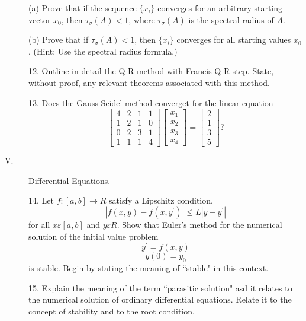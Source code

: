\documentclass{article}
\begin{document}
\begin{description}
\item[\qquad] (a)
Prove that if the sequence $\{x_i\}$ converges for an arbitrary starting
vector $x_0$, then $\tau_\sigma (A) < 1$, where $\tau_\sigma (A)$ is
the spectral radius of $A$.

\item[\qquad] (b)
Prove that if $\tau_\sigma (A) < 1$, then $\{x_i\}$ converges for all starting
values $x_0$. (Hint: Use the spectral radius formula.)

\item[\quad] 12.
Outline in detail the Q-R method with Francis Q-R step. State, without
proof, any relevant theorems associated with this method.

\item[\quad] 13.
Does the Gauss-Seidel method converget for the linear equation
$$\left[\begin{array}{cccc}
        4&2&1&1 \\
        1&2&1&0 \\
        0&2&3&1 \\
        1&1&1&4
        \end{array}
        \right]
  \left[\begin{array} {c}
        x_1 \\
        x_2 \\
        x_3 \\
        x_4
        \end{array}
        \right]
   = \left[\begin{array}{c}
        2 \\
        1 \\
        3 \\
        5
        \end{array}
        \right]
         ?$$

\item[V.]
Differential Equations.

\item[\quad] 14.
Let $f: [a,b] \to R$ satisfy a Lipschitz condition,
$$|f(x,y) - f(x,y^\prime)| \leq L|y-y^\prime|$$
for all $x\varepsilon [a,b]$ and $y \varepsilon R$. Show that Euler's
method for the numerical solution of the initial value problem
$$y^\prime = f(x,y)$$
$$y(0) = y_0$$
is stable. Begin by stating the meaning of ``stable" in this context.

\item[\quad] 15.
Explain the meaning of the term ``parasitic solution" asd it relates to the
numerical solution of ordinary differential equations. Relate it to the
concept of stability and to the root condition.




\end{description}    
\end{document}
